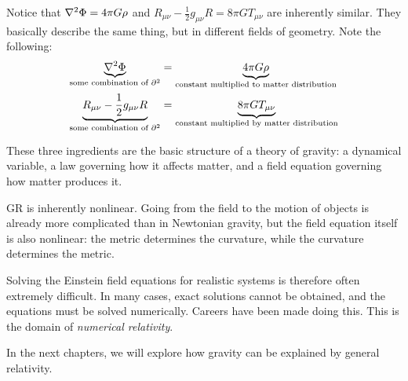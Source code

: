 		\begin{remark}
			Notice that $\lpc \Phi = 4\pi G \rho$ and $
					R_{\mu\nu}
					-\frac{1}{2}g_{\mu\nu}R
					=
					8\pi G T_{\mu\nu}
					$ 
			are inherently similar. They basically describe the same thing, but in different fields of geometry.
			Note the following:
			\begin{align*} 
				\underbrace{\lpc\Phi}_{\text{some combination of }\partial^2} &= \underbrace{4\pi G\rho}_{\text{constant multiplied to matter distribution}}
				\\
				\underbrace{R_{\mu\nu}
				-\frac{1}{2}g_{\mu\nu}R}
				_{\text{some combination of }\partial^2}
																	   &=
				\underbrace{8\pi G T_{\mu\nu}}
				_{\text{constant multiplied by matter distribution}}
			\end{align*}
		\end{remark}
		These three ingredients are the basic structure of a theory of gravity: a dynamical variable, a law governing how it affects matter, and a field equation governing how matter produces it.

		GR is inherently nonlinear. Going from the field to the motion of objects is already more complicated than in Newtonian gravity, but the field equation itself is also nonlinear: the metric determines the curvature, while the curvature determines the metric.

		Solving the Einstein field equations for realistic systems is therefore often extremely difficult. In many cases, exact solutions cannot be obtained, and the equations must be solved numerically. Careers have been made doing this. This is the domain of \textit{numerical relativity}.

		In the next chapters, we will explore how gravity can be explained by general relativity.
